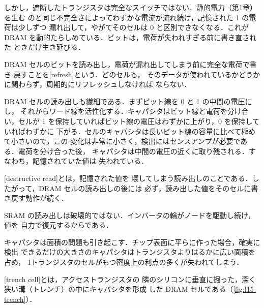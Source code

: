 \documentclass[../main.tex]{subfiles}
\begin{document}
しかし，遮断したトランジスタは完全なスイッチではない．静的電力（第1章）を生む
のと同じ不完全さによってわずかな電流が流れ続け，記憶された 1 の電荷は少しずつ
漏れ出して，やがてそのセルは 0 と区別できなくなる．これが
DRAM を動的たらしめている．ビットは，電荷が失われすぎる前に書き直された
ときだけ生き延びる．

\begin{definition}[リフレッシュ]
  DRAM セルのビットを読み出し，電荷が漏れ出してしまう前に完全な電荷で書き
  戻すことを[refresh]という．どのセルも，
  そのデータが使われているかどうかに関わらず，周期的にリフレッシュしなければ
  ならない．
\end{definition}

DRAM セルの読み出しも繊細である．まずビット線を 0 と 1 の中間の電圧にし，
それからワード線を活性化する．キャパシタはビット線と電荷を分け合い，セルが
1 を保持していればビット線の電圧はわずかに上がり，0 を保持していればわずかに
下がる．セルのキャパシタは長いビット線の容量に比べて極めて小さいので，この
変化は非常に小さく，検出にはセンスアンプが必要である．電荷を分け合った後，
キャパシタは中間の電圧の近くに取り残される．すなわち，記憶されていた値は
失われている．

\begin{definition}[破壊読み出し]
  [destructive read]とは，記憶された値を
  壊してしまう読み出しのことである．したがって，DRAM セルの読み出しの後には
  必ず，読み出した値をそのセルに書き戻す動作が続く．
\end{definition}

SRAM の読み出しは破壊的ではない．インバータの輪がノードを駆動し続け，値を
自力で復元するからである．

キャパシタは面積の問題も引き起こす．チップ表面に平らに作った場合，確実に検出
できるだけの大きさのキャパシタはトランジスタよりはるかに広い面積を占め，
1トランジスタのセルがもつ密度上の利点の多くが失われてしまう．

\begin{definition}[トレンチセル]
  [trench cell]とは，アクセストランジスタの
  隣のシリコンに垂直に掘った，深く狭い溝（トレンチ）の中にキャパシタを形成
  した DRAM セルである（\cref{fig:l15-trench}）．
\end{definition}

\begin{marginfigure}
  
  \caption{トレンチセルの断面（模式図）．}
  \label{fig:l15-trench}
\end{marginfigure}
\end{document}
